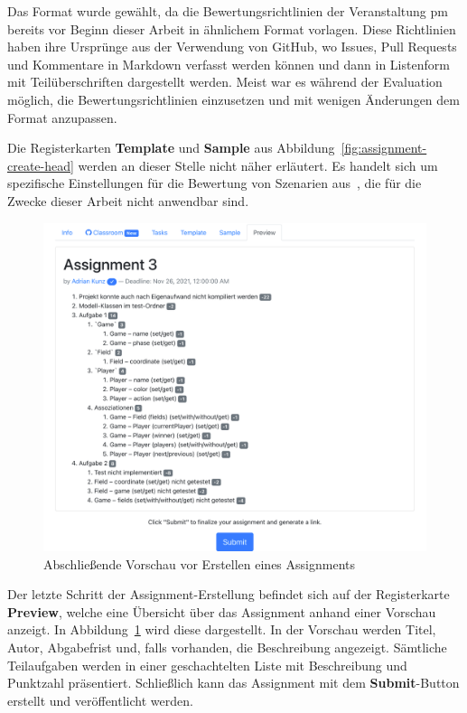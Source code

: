 Das Format wurde gewählt, da die Bewertungsrichtlinien der Veranstaltung \ac{pm} bereits vor Beginn dieser Arbeit in ähnlichem Format vorlagen.
Diese Richtlinien haben ihre Ursprünge aus der Verwendung von GitHub, wo Issues, Pull Requests und Kommentare in Markdown verfasst werden können und dann in Listenform mit Teilüberschriften dargestellt werden.
Meist war es während der Evaluation möglich, die Bewertungsrichtlinien einzusetzen und mit wenigen Änderungen dem Format anzupassen.

Die Registerkarten \textbf{Template} und \textbf{Sample} aus Abbildung~\ref{fig:assignment-create-head} werden an dieser Stelle nicht näher erläutert.
Es handelt sich um spezifische Einstellungen für die Bewertung von Szenarien aus~\cite{bachelor-thesis}, die für die Zwecke dieser Arbeit nicht anwendbar sind.

\begin{figure}
    \centering
    \includegraphics[width=\textwidth]{images/assignment-create-preview}
    \caption{Abschließende Vorschau vor Erstellen eines Assignments}
    \label{fig:assignment-create-preview}
\end{figure}

Der letzte Schritt der Assignment-Erstellung befindet sich auf der Registerkarte \textbf{Preview}, welche eine Übersicht über das Assignment anhand einer Vorschau anzeigt.
In Abbildung~\ref{fig:assignment-create-preview} wird diese dargestellt.
In der Vorschau werden Titel, Autor, Abgabefrist und, falls vorhanden, die Beschreibung angezeigt.
Sämtliche Teilaufgaben werden in einer geschachtelten Liste mit Beschreibung und Punktzahl präsentiert.
Schließlich kann das Assignment mit dem \textbf{Submit}-Button erstellt und veröffentlicht werden.

